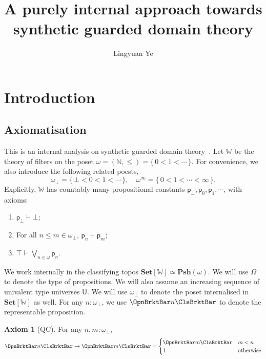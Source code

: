 \documentclass[a4paper,10pt]{amsart}
\title{A purely internal approach towards synthetic guarded domain theory}
\author{Lingyuan Ye}
\theoremstyle{definition}
\newtheorem*{axiom}{Axiom}
\newcommand{\mb}[1]{\mathbf{#1}}
\newcommand{\mbb}[1]{\mathbb{#1}}
\newcommand{\ms}[1]{\mathsf{#1}}
\newcommand{\Set}{\mb{Set}}
\newcommand{\psh}{\mb{Psh}}
\newcommand{\other}{\mathrm{otherwise}}
\newcommand{\set}[1]{\{\,#1\,\}}
\newcommand{\N}{\mbb N}
\newcommand{\ass}[1]{\OpnBrktBar#1\ClsBrktBar}
\newcommand{\W}{\mathbb W}
\newcommand{\ovob}{\omega_\bot}
\newcommand{\Type}{\ms U}
\newcommand{\Prop}{\Omega}
\begin{document}
%

%
%

%
%

%
\maketitle              %
%

\section{Introduction}

\subsection{Axiomatisation}

This is an internal analysis on synthetic guarded domain theory~\cite{birkedal2012first}. Let $\W$ be the theory of filters on the poset $\omega = (\N,\le) = \set{0 < 1 < \cdots}$. For convenience, we also introduce the following related poests, 
\[ \ovob = \set{\bot < 0 < 1 < \cdots}, \quad \omega^\infty = \set{0<1<\cdots<\infty}. \]
Explicitly, $\W$ has countably many propositional constants $\ms p_\bot,\ms p_0,\ms p_1,\cdots$, with axioms:
\begin{enumerate}
  \item[(w1)] $\ms p_\bot \vdash \bot$;
  \item[(w2)] For all $n\le m\in\ovob$, $\ms p_n \vdash \ms p_m$;
  \item[(w3)] $\top \vdash \bigvee_{n\in\omega} \ms p_n$.
\end{enumerate}
We work internally in the classifying topos $\Set[\W] \simeq \psh(\omega)$. We will use $\Prop$ to denote the type of propositions. We will also assume an increasing sequence of univalent type universes $\Type$. We will use $\ovob$ to denote the poset internalised in $\Set[\W]$ as well. For any $n:\ovob$, we use $\ass{n}$ to denote the representable proposition.

\begin{axiom}[QC]\label{sgdqc}
  For any $n,m:\ovob$, 
  \[
  \ass n \to \ass m =
  \begin{cases}
    \ass m & m < n \\ 
    1 & \other
  \end{cases}
  \]
\end{axiom}
\end{document}
